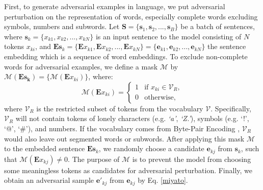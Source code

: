 \documentclass[letterpaper]{article} %
\begin{document}
First, to generate adversarial examples in language, we put adversarial perturbation on the representation of words, especially complete words excluding symbols, numbers and subwords. Let $\mathbf{S} = \{\mathbf{s}_1, \mathbf{s}_2, ... , \mathbf{s}_B\}$ be a batch of sentences, where $\mathbf{s}_k = \{x_{k1}, x_{k2}, ... , x_{kN}\}$ is an input sentence to the model consisting of $N$ tokens $x_{ki}$, and $\mathbf{E s}_k = \{\mathbf{E}x_{k1}, \mathbf{E}x_{k2}, ... , \mathbf{E}x_{kN} \} = \{\mathbf{e}_{k1}, \mathbf{e}_{k2}, ... , \mathbf{e}_{kN} \}$ the sentence embedding which is a sequence of word embeddings. To exclude non-complete words for adversarial examples, we define a mask $\mathcal{M}$ by $\mathcal{M}(\mathbf{\mathbf{Es}_k}) = \{\mathcal{M}(\mathbf{E}x_{ki})\}$, where:
\[ 
\mathcal{M}(\mathbf{E}x_{ki})=\begin{cases} 
      1 & \text{if } x_{ki}\in \mathcal{V}_R, \\
      0 & \text{otherwise},
      \end{cases}
\]
where $\mathcal{V}_R$ is the restricted subset of tokens from the vocabulary $\mathcal{V}$. Specifically, $\mathcal{V}_R$ will not contain tokens of lonely characters (e.g. \textit{`a'}, \textit{`Z.'}), symbols (e.g. `!', `@', `\#'), and numbers. If the vocabulary comes from Byte-Pair Encoding \cite{sennrich2015neural}, $\mathcal{V}_R$ would also leave out segmented words or subwords. After applying this mask $\mathcal{M}$ to the embedded sentence $\mathbf{Es}_k$, we randomly choose a candidate $\mathbf{e}_{kj}$ from $\mathbf{s}_k$, such that $\mathcal{M}(\mathbf{E}x_{kj}) \neq 0$. The purpose of $\mathcal{M}$ is to prevent the model from choosing some meaningless tokens as candidates for adversarial perturbation. Finally, we obtain an adversarial sample $\mathbf{e}'_{kj}$ from $\mathbf{e}_{kj}$ by Eq. \ref{miyato}.
\end{document}
